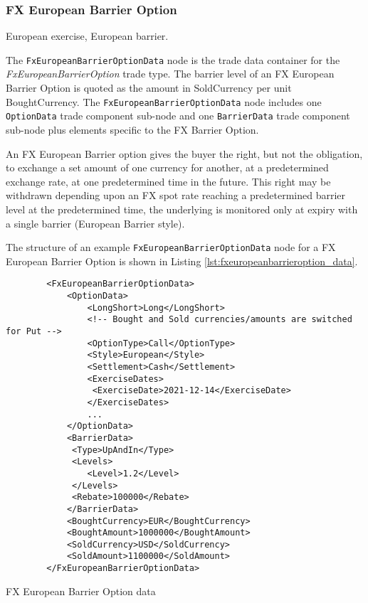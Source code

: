 \subsubsection{FX European Barrier Option}

European exercise, European barrier.

The \lstinline!FxEuropeanBarrierOptionData!  node is the trade data container for the \emph{FxEuropeanBarrierOption} trade type.    The barrier level of an FX European Barrier Option is quoted as the amount in SoldCurrency
per unit BoughtCurrency. The \lstinline!FxEuropeanBarrierOptionData!  node includes one  \lstinline!OptionData! trade component sub-node and one \lstinline!BarrierData! trade component sub-node plus elements
specific to the FX Barrier Option. 

An FX European Barrier option gives the buyer the right, but not the obligation, to
exchange a set amount of one currency for another, at a predetermined exchange rate,
at one predetermined time in the future. This right may be withdrawn depending upon
an FX spot rate reaching a predetermined barrier level at the predetermined time, the
underlying is monitored only at expiry with a single barrier (European Barrier style).

The structure of an example \lstinline!FxEuropeanBarrierOptionData! node for a FX European Barrier Option is shown in Listing
\ref{lst:fxeuropeanbarrieroption_data}.

\begin{listing}[H]
\begin{verbatim}
        <FxEuropeanBarrierOptionData>
            <OptionData>
                <LongShort>Long</LongShort>
                <!-- Bought and Sold currencies/amounts are switched for Put -->
                <OptionType>Call</OptionType>
                <Style>European</Style>
                <Settlement>Cash</Settlement>                
                <ExerciseDates>
                 <ExerciseDate>2021-12-14</ExerciseDate>
                </ExerciseDates>
                ...
            </OptionData>
            <BarrierData>
             <Type>UpAndIn</Type>
             <Levels>
                <Level>1.2</Level>
             </Levels>
             <Rebate>100000</Rebate>            
            </BarrierData>
            <BoughtCurrency>EUR</BoughtCurrency>
            <BoughtAmount>1000000</BoughtAmount>
            <SoldCurrency>USD</SoldCurrency>
            <SoldAmount>1100000</SoldAmount>
        </FxEuropeanBarrierOptionData>
\end{verbatim}
\caption{FX European Barrier Option data}
\label{lst:fxeuropeanbarrieroption_data}
\end{listing}

